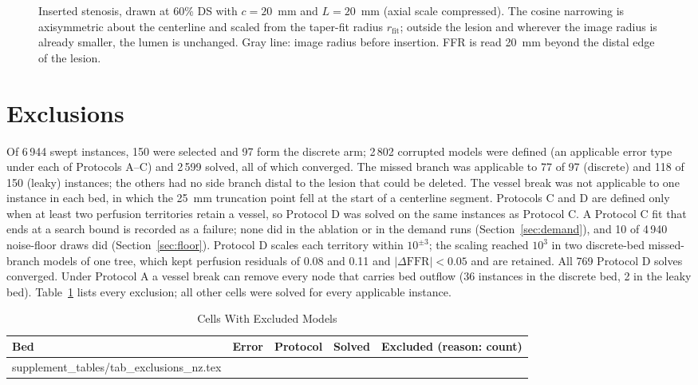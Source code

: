\documentclass[journal,twoside,web,onecolumn]{ieeecolor}
\begin{document}
\begin{figure}[!ht]
\caption{Inserted stenosis, drawn at 60\% DS with $c = 20$~mm and $L = 20$~mm (axial scale compressed). The cosine
narrowing is axisymmetric about the centerline and scaled from the taper-fit radius $r_\mathrm{fit}$; outside the
lesion and wherever the image radius is already smaller, the lumen is unchanged. Gray line: image radius before
insertion. FFR is read 20~mm beyond the distal edge of the lesion.}\label{fig:stenosis}
\end{figure}

\FloatBarrier
\section{Exclusions}
Of 6\,944 swept instances, 150 were selected and 97 form the discrete arm; 2\,802 corrupted models were defined
(an applicable error type under each of Protocols A--C) and 2\,599 solved, all of which converged. The missed branch was applicable to 77 of 97 (discrete) and 118 of 150 (leaky)
instances; the others had no side branch distal to the lesion that could be deleted. The vessel break was not
applicable to one instance in each bed, in which the 25~mm truncation point fell at the start of a centerline segment.
Protocols C and D are defined only when at least two perfusion territories retain a vessel, so Protocol D was solved on the same instances as Protocol C. A Protocol C fit that ends at a search bound
is recorded as a failure; none did in the ablation or in the demand runs (Section~\ref{sec:demand}), and 10 of
4\,940 noise-floor draws did (Section~\ref{sec:floor}). Protocol D scales each territory within $10^{\pm 3}$; the
scaling reached $10^3$ in two discrete-bed missed-branch models of one tree, which kept perfusion residuals of 0.08 and
0.11 and $|\Delta\mathrm{FFR}| < 0.05$ and are retained. All 769 Protocol D solves converged. Under Protocol A a vessel break can remove every node that
carries bed outflow (36 instances in the discrete bed, 2 in the leaky bed). Table~\ref{tab:excl} lists every
exclusion; all other cells were solved for every applicable instance.
\begin{table}[!ht]
\caption{Cells With Excluded Models}\label{tab:excl}
\centering\small
\begin{tabular}{@{}lllrl@{}}
\toprule
Bed & Error & Protocol & Solved & Excluded (reason: count)\\
\midrule
{} supplement_tables/tab_exclusions_nz.tex 
\bottomrule
\end{tabular}
\end{table}
\end{document}
